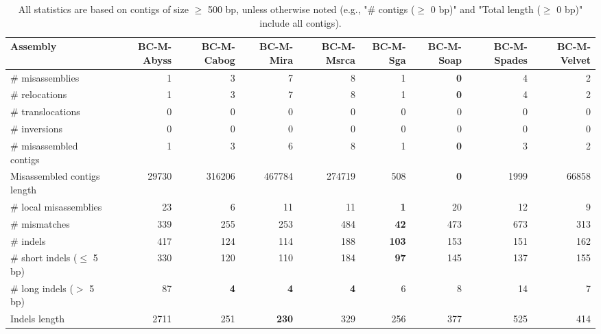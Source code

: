 \documentclass[12pt,a4paper]{article}
\begin{document}
\begin{table}[ht]
\begin{center}
\caption{All statistics are based on contigs of size $\geq$ 500 bp, unless otherwise noted (e.g., "\# contigs ($\geq$ 0 bp)" and "Total length ($\geq$ 0 bp)" include all contigs).}
\begin{tabular}{|l*{8}{|r}|}
\hline
Assembly & BC-M-Abyss & BC-M-Cabog & BC-M-Mira & BC-M-Msrca & BC-M-Sga & BC-M-Soap & BC-M-Spades & BC-M-Velvet \\ \hline
\# misassemblies & 1 & 3 & 7 & 8 & 1 & {\bf 0} & 4 & 2 \\ \hline
\hspace{5mm}\# relocations & 1 & 3 & 7 & 8 & 1 & {\bf 0} & 4 & 2 \\ \hline
\hspace{5mm}\# translocations & 0 & 0 & 0 & 0 & 0 & 0 & 0 & 0 \\ \hline
\hspace{5mm}\# inversions & 0 & 0 & 0 & 0 & 0 & 0 & 0 & 0 \\ \hline
\# misassembled contigs & 1 & 3 & 6 & 8 & 1 & {\bf 0} & 3 & 2 \\ \hline
Misassembled contigs length & 29730 & 316206 & 467784 & 274719 & 508 & {\bf 0} & 1999 & 66858 \\ \hline
\# local misassemblies & 23 & 6 & 11 & 11 & {\bf 1} & 20 & 12 & 9 \\ \hline
\# mismatches & 339 & 255 & 253 & 484 & {\bf 42} & 473 & 673 & 313 \\ \hline
\# indels & 417 & 124 & 114 & 188 & {\bf 103} & 153 & 151 & 162 \\ \hline
\hspace{5mm}\# short indels ($\leq$ 5 bp) & 330 & 120 & 110 & 184 & {\bf 97} & 145 & 137 & 155 \\ \hline
\hspace{5mm}\# long indels ($>$ 5 bp) & 87 & {\bf 4} & {\bf 4} & {\bf 4} & 6 & 8 & 14 & 7 \\ \hline
Indels length & 2711 & 251 & {\bf 230} & 329 & 256 & 377 & 525 & 414 \\ \hline
\end{tabular}
\end{center}
\end{table}
\end{document}
